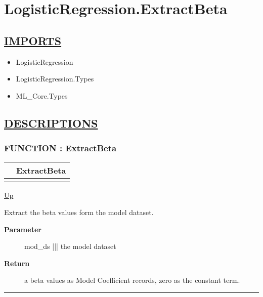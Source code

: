 \chapter*{LogisticRegression.ExtractBeta}
\hypertarget{ecldoc:toc:LogisticRegression.ExtractBeta}{}

\section*{\underline{IMPORTS}}
\begin{itemize}
\item LogisticRegression
\item LogisticRegression.Types
\item ML\_Core.Types
\end{itemize}

\section*{\underline{DESCRIPTIONS}}
\subsection*{FUNCTION : ExtractBeta}
\hypertarget{ecldoc:logisticregression.extractbeta}{}

{\renewcommand{\arraystretch}{1.5}
\begin{tabularx}{\textwidth}{|>{\raggedright\arraybackslash}l|X|}
\hline
\hspace{0pt} & ExtractBeta \\
\hline
\multicolumn{2}{|>{\raggedright\arraybackslash}X|}{\hspace{0pt}(DATASET(Core\_Types.Layout\_Model) mod\_ds)} \\
\hline
\end{tabularx}
}

\hyperlink{ecldoc:toc:LogisticRegression}{Up}

\par
Extract the beta values form the model dataset.

\par
\begin{description}
\item [\textbf{Parameter}] mod\_ds ||| the model dataset
\item [\textbf{Return}] a beta values as Model Coefficient records, zero as the constant term.
\end{description}

\rule{\textwidth}{0.4pt}
